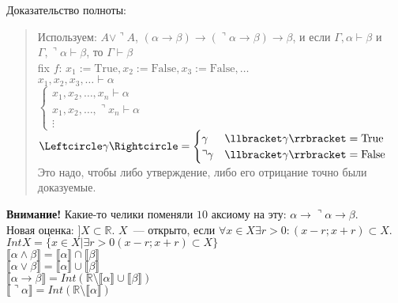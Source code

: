 \documentclass{article}
\begin{document}
	Доказательство полноты:
	\begin{quote}
		Используем: $A \vee \urcorner A$, $(\alpha \rightarrow \beta) \rightarrow (\urcorner \alpha \rightarrow \beta) \rightarrow \beta$, и если $\Gamma, \alpha \vdash \beta$ и $\Gamma, \urcorner \alpha \vdash \beta$, то $\Gamma \vdash \beta$ \\
		fix $f$: $x_1 := \text{True}, x_2 := \text{False}, x_3 := \text{False}, \dots$ \\
		$x_1, x_2, x_3, \dots \vdash \alpha$ \\
		$\begin{cases}
			x_1, x_2, \dots, x_n \vdash \alpha \\
			x_1, x_2, \dots, \urcorner x_n \vdash \alpha \\
			\vdots
		\end{cases}$ \\
		$\Leftcircle \gamma \Rightcircle =
		\begin{cases}
			\gamma & \llbracket \gamma \rrbracket = \text{True} \\
			\urcorner \gamma & \llbracket \gamma \rrbracket = \text{False}
		\end{cases}
		$ Это надо, чтобы либо утверждение, либо его отрицание точно были доказуемые. \\
	\end{quote}
	\textbf{Внимание!} Какие-то челики поменяли $10$ аксиому на эту: $\alpha \rightarrow \urcorner \alpha \rightarrow \beta$. \\
	Новая оценка: $] X \subset \mathbb{R}$. $X$~--- открыто, если $\forall x \in X \exists r > 0: (x - r; x + r) \subset X$. $Int X = \{ x \in X | \exists r > 0 (x - r; x + r) \subset X \}$ \\
	$\llbracket \alpha \wedge \beta \rrbracket = \llbracket \alpha \rrbracket \cap \llbracket \beta \rrbracket$ \\
	$\llbracket \alpha \vee \beta \rrbracket = \llbracket \alpha \rrbracket \cup \llbracket \beta \rrbracket$ \\
	$\llbracket \alpha \rightarrow \beta \rrbracket = Int(\mathbb{R} \setminus \llbracket \alpha \rrbracket \cup \llbracket \beta \rrbracket)$ \\
	$\llbracket \urcorner \alpha \rrbracket = Int(\mathbb{R} \setminus \llbracket \alpha \rrbracket)$
\end{document}
